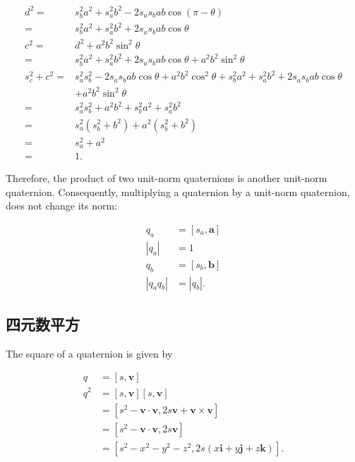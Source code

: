 $$
\begin{aligned}
d^{2}= & s_{b}^{2} a^{2}+s_{a}^{2} b^{2}-2 s_{a} s_{b} a b \cos (\pi-\theta) \\
= & s_{b}^{2} a^{2}+s_{a}^{2} b^{2}+2 s_{a} s_{b} a b \cos \theta \\
c^{2}= & d^{2}+a^{2} b^{2} \sin ^{2} \theta \\
= & s_{b}^{2} a^{2}+s_{a}^{2} b^{2}+2 s_{a} s_{b} a b \cos \theta+a^{2} b^{2} \sin ^{2} \theta \\
s_{c}^{2}+c^{2}= & s_{a}^{2} s_{b}^{2}-2 s_{a} s_{b} a b \cos \theta+a^{2} b^{2} \cos ^{2} \theta+s_{b}^{2} a^{2}+s_{a}^{2} b^{2}+2 s_{a} s_{b} a b \cos \theta \\
& +a^{2} b^{2} \sin ^{2} \theta \\
= & s_{a}^{2} s_{b}^{2}+a^{2} b^{2}+s_{b}^{2} a^{2}+s_{a}^{2} b^{2} \\
= & s_{a}^{2}\left(s_{b}^{2}+b^{2}\right)+a^{2}\left(s_{b}^{2}+b^{2}\right) \\
= & s_{a}^{2}+a^{2} \\
= & 1 .
\end{aligned}
$$

Therefore, the product of two unit-norm quaternions is another unit-norm quaternion. Consequently, multiplying a quaternion by a unit-norm quaternion, does not change its norm:

$$
\begin{aligned}
q_{a} & =\left[s_{a}, \mathbf{a}\right] \\
\left|q_{a}\right| & =1 \\
q_{b} & =\left[s_{b}, \mathbf{b}\right] \\
\left|q_{a} q_{b}\right| & =\left|q_{b}\right| .
\end{aligned}
$$

\subsection{四元数平方}
The square of a quaternion is given by

$$
\begin{aligned}
q & =[s, \mathbf{v}] \\
q^{2} & =[s, \mathbf{v}][s, \mathbf{v}] \\
& =\left[s^{2}-\mathbf{v} \cdot \mathbf{v}, 2 s \mathbf{v}+\mathbf{v} \times \mathbf{v}\right] \\
& =\left[s^{2}-\mathbf{v} \cdot \mathbf{v}, 2 s \mathbf{v}\right] \\
& =\left[s^{2}-x^{2}-y^{2}-z^{2}, 2 s(x \mathbf{i}+y \mathbf{j}+z \mathbf{k})\right] .
\end{aligned}
$$

